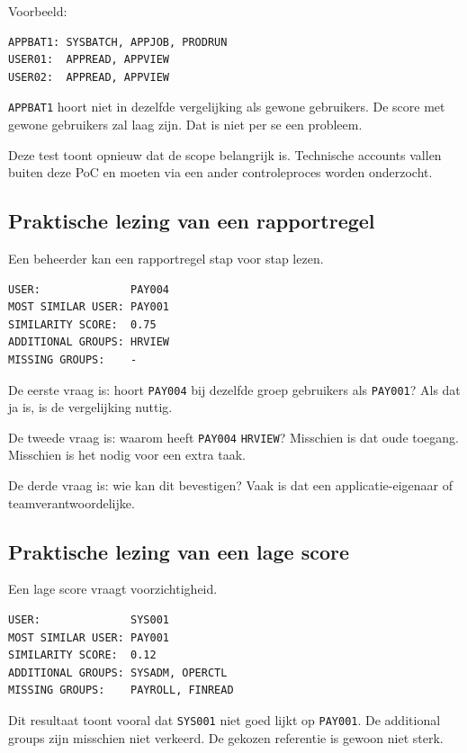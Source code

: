 Voorbeeld:

\begin{verbatim}
APPBAT1: SYSBATCH, APPJOB, PRODRUN
USER01:  APPREAD, APPVIEW
USER02:  APPREAD, APPVIEW
\end{verbatim}

\texttt{APPBAT1} hoort niet in dezelfde vergelijking als gewone gebruikers. De score met gewone gebruikers zal laag zijn. Dat is niet per se een probleem.

Deze test toont opnieuw dat de scope belangrijk is. Technische accounts vallen buiten deze PoC en moeten via een ander controleproces worden onderzocht.

\subsection*{Praktische lezing van een rapportregel}

Een beheerder kan een rapportregel stap voor stap lezen.

\begin{verbatim}
USER:              PAY004
MOST SIMILAR USER: PAY001
SIMILARITY SCORE:  0.75
ADDITIONAL GROUPS: HRVIEW
MISSING GROUPS:    -
\end{verbatim}

De eerste vraag is: hoort \texttt{PAY004} bij dezelfde groep gebruikers als \texttt{PAY001}? Als dat ja is, is de vergelijking nuttig.

De tweede vraag is: waarom heeft \texttt{PAY004} \texttt{HRVIEW}? Misschien is dat oude toegang. Misschien is het nodig voor een extra taak.

De derde vraag is: wie kan dit bevestigen? Vaak is dat een applicatie-eigenaar of teamverantwoordelijke.

\subsection*{Praktische lezing van een lage score}

Een lage score vraagt voorzichtigheid.

\begin{verbatim}
USER:              SYS001
MOST SIMILAR USER: PAY001
SIMILARITY SCORE:  0.12
ADDITIONAL GROUPS: SYSADM, OPERCTL
MISSING GROUPS:    PAYROLL, FINREAD
\end{verbatim}

Dit resultaat toont vooral dat \texttt{SYS001} niet goed lijkt op \texttt{PAY001}. De additional groups zijn misschien niet verkeerd. De gekozen referentie is gewoon niet sterk.

